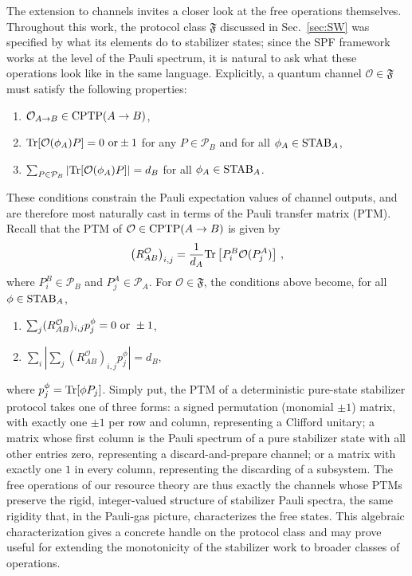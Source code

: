 \documentclass[aps,pra,superscriptaddress,twocolumn,longbibliography]{revtex4-2}
\newcommand{\tr}{{\rm Tr}}
\newcommand{\cptp}{{\rm CPTP}}
\newcommand{\eqs}[1]{\begin{align}#1\end{align}}
\def\mO{\mathcal{O}}
\def\mP{\mathcal{P}}
\def\mf{\mathfrak{F}}
\begin{document}
The extension to channels invites a closer look at the free operations themselves. Throughout this work, the protocol class $\mf$ discussed in Sec.~\ref{sec:SW} was specified by what its elements do to stabilizer states; since the SPF framework works at the level of the Pauli spectrum, it is natural to ask what these operations look like in the same language. Explicitly, a quantum channel $\mO\in\mf$ must satisfy the following properties:
\begin{enumerate}
    \item $\mO_{A\to B}\in \cptp(A\to B)$,
    \item $\tr[\mO(\phi_A)P] = 0\ {\rm or} \pm1$ for any $P\in\mP_B$ and for all $\phi_A\in {\rm STAB}_A$,
    \item $\sum_{P\in \mP_B} |\tr[\mO(\phi_A)P]| = d_B$ for all $\phi_A\in {\rm STAB}_A$.
\end{enumerate}
These conditions constrain the Pauli expectation values of channel outputs, and are therefore most naturally cast in terms of the Pauli transfer matrix (PTM). Recall that the PTM of $\mO\in\cptp(A\to B)$ is given by
\eqs{
\left(R^{\mO}_{AB}\right)_{i,j} =\frac{1}{d_A} \tr\left[ P^B_i \mO(P^A_j)\right]\,,
}
where $P^B_i\in \mP_B$ and $P^A_j\in \mP_A$. For $\mO\in \mf$, the conditions above become, for all $\phi\in {\rm STAB}_A$,
\begin{enumerate}
    \item $\sum_j (R^{\mO}_{AB})_{i,j}p^{\phi}_j = 0 \ {\rm or}\ \pm1$,
    \item $\sum_i \left| \sum_j (R^{\mO}_{AB})_{i,j}p^{\phi}_j \right| = d_B$,
\end{enumerate}
where $p^{\phi}_j = \tr[\phi P_j]$. Simply put, the PTM of a deterministic pure-state stabilizer protocol takes one of three forms: a signed permutation (monomial $\pm1$) matrix, with exactly one $\pm1$ per row and column, representing a Clifford unitary; a matrix whose first column is the Pauli spectrum of a pure stabilizer state with all other entries zero, representing a discard-and-prepare channel; or a matrix with exactly one $1$ in every column, representing the discarding of a subsystem. The free operations of our resource theory are thus exactly the channels whose PTMs preserve the rigid, integer-valued structure of stabilizer Pauli spectra, the same rigidity that, in the Pauli-gas picture, characterizes the free states.
This algebraic characterization gives a concrete handle on the protocol class and may prove useful for extending the monotonicity of the stabilizer work to broader classes of operations.
\end{document}
